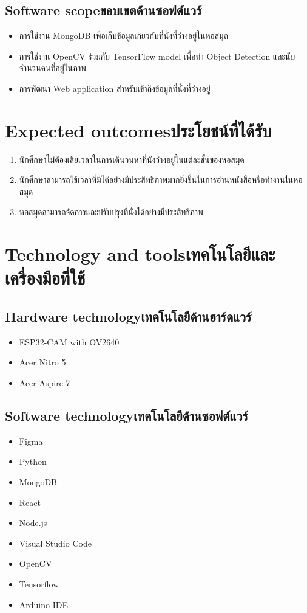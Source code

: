 \subsection{\ifenglish Software scope\else ขอบเขตด้านซอฟต์แวร์\fi}
\begin{itemize}
    \item การใช้งาน MongoDB เพื่อเก็บข้อมูลเกี่ยวกับที่นั่งที่ว่างอยู่ในหอสมุด
    \item การใช้งาน OpenCV ร่วมกับ TensorFlow model เพื่อทำ Object Detection และนับจำนวนคนที่อยู่ในภาพ
    \item การพัฒนา Web application สำหรับเข้าถึงข้อมูลที่นั่งที่ว่างอยู่
\end{itemize}

\section{\ifenglish Expected outcomes\else ประโยชน์ที่ได้รับ\fi}
\begin{enumerate}
   \item นักศึกษาไม่ต้องเสียเวลาในการเดินวนหาที่นั่งว่างอยู่ในแต่ละชั้นของหอสมุด
   \item นักศึกษาสามารถใช้เวลาที่มีได้อย่างมีประสิทธิภาพมากยิ่งขึ้นในการอ่านหนังสือหรือทำงานในหอสมุด
   \item หอสมุดสามารถจัดการและปรับปรุงที่นั่งได้อย่างมีประสิทธิภาพ 
\end{enumerate}
\section{\ifenglish Technology and tools\else เทคโนโลยีและเครื่องมือที่ใช้\fi}

\subsection{\ifenglish Hardware technology\else เทคโนโลยีด้านฮาร์ดแวร์\fi}
\begin{itemize}
    \item ESP32-CAM with OV2640
    \item Acer Nitro 5
    \item Acer Aspire 7
\end{itemize}
\subsection{\ifenglish Software technology\else เทคโนโลยีด้านซอฟต์แวร์\fi}
\begin{itemize}
    \item Figma
    \item Python
    \item MongoDB
    \item React
    \item Node.js
    \item Visual Studio Code
    \item OpenCV
    \item Tensorflow
    \item Arduino IDE    
\end{itemize}

